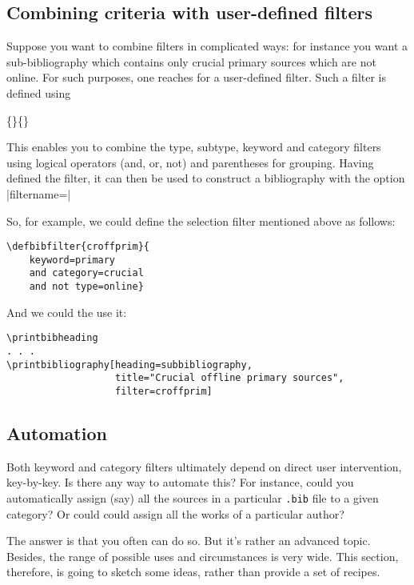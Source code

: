 \subsection{Combining criteria with user-defined filters}

Suppose you want to combine filters in complicated ways: for instance
you want a sub-bibliography which contains only crucial primary
sources which are not online. For such purposes, one reaches for a
user-defined filter. Such a filter is defined using
\begin{pseudoverb}
  \centering
  \{\}\{\}
\end{pseudoverb}
This enables you to combine the type, subtype, keyword and category
filters using logical operators (and, or, not) and parentheses for
grouping. Having defined the filter, it can then be used to construct
a bibliography with the option |filtername=|

So, for example, we could define the selection filter mentioned above
as follows:

\begin{Verbatim}
\defbibfilter{croffprim}{
    keyword=primary
    and category=crucial
    and not type=online}
\end{Verbatim}
And we could the use it:

\begin{Verbatim}
\printbibheading
. . .
\printbibliography[heading=subbibliography,
                   title="Crucial offline primary sources",
                   filter=croffprim]
\end{Verbatim}

\subsection{Automation}

Both keyword and category filters ultimately depend on direct user
intervention, key-by-key. Is there any way to automate this? For
instance, could you automatically assign (say) all the sources in a
particular \texttt{.bib} file to a given category? Or could could
assign all the works of a particular author?

The answer is that you often can do so. But it's rather an advanced
topic. Besides, the range of possible uses and circumstances is very
wide. This section, therefore, is going to sketch some ideas, rather
than provide a set of recipes.

